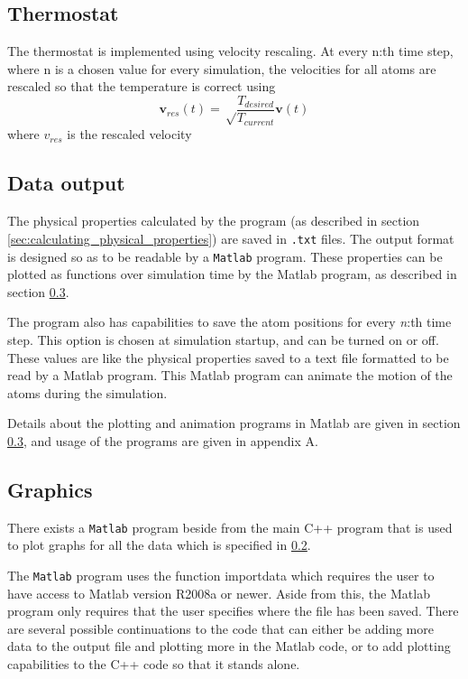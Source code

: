 \documentclass[12pt,a4paper]{article}
\begin{document}
\subsection{Thermostat}
\label{sec:thermostat}

The thermostat is implemented using velocity rescaling.
At every n:th time step, where n is a chosen value for every simulation, the velocities for all atoms are rescaled so that the temperature is correct using
\begin{equation}
\mathbf v_{res}(t)=\sqrt \frac {T_{desired}} {T_{current}} \mathbf v(t)
\end{equation}
where \( v_{res}\) is the rescaled velocity

\subsection{Data output}
\label{sec:data_output}
The physical properties calculated by the program (as described in section \ref{sec:calculating_physical_properties}) are saved in \texttt{.txt} files. The output format is designed so as to be readable by a \texttt{Matlab} program. These properties can be plotted as functions over simulation time by the Matlab program, as described in section \ref{sec:graphics}. 

The program also has capabilities to save the atom positions for every \emph{n}:th time step. This option is chosen at simulation startup, and can be turned on or off. These values are like the physical properties saved to a text file formatted to be read by a Matlab program. This Matlab program can animate the motion of the atoms during the simulation. 

Details about the plotting and animation programs in Matlab are given in section \ref{sec:graphics}, and usage of the programs are given in appendix A.

\subsection{Graphics}
\label{sec:graphics}

There exists a \texttt{Matlab} program beside from the main C++ program that is used to plot graphs for all the data which is specified in \ref{sec:data_output}.

The \texttt{Matlab} program uses the function importdata which requires the user to have access to Matlab version R2008a or newer. Aside from this, the Matlab program only requires that the user specifies where the file has been saved. There are several possible continuations to the code that can either be adding more data to the output file and plotting more in the Matlab code, or to add plotting capabilities to the C++ code so that it stands alone.
\end{document}

